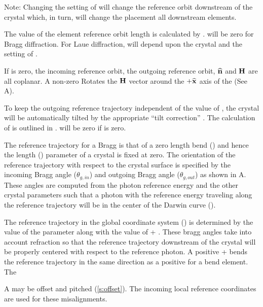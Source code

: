 Note: Changing the setting of  will change the
reference orbit downstream of the crystal which, in turn, will change
the placement all downstream elements.

The value of the element reference orbit length  is calculated
by \bmad.  will be zero for Bragg diffraction. For Laue
diffraction,  will depend upon the crystal  and
the setting of .

If  is zero, the incoming reference orbit, the outgoing
reference orbit, ${\widehat{\bf n}}$ and ${\bf H}$ are all coplanar. A non-zero
 Rotates the ${\bf H}$ vector around the $+{\widehat{\bf x}}$ axis
of the  (See A).

To keep the outgoing reference trajectory independent of the value of
, the crystal will be automatically tilted by the
appropriate ``tilt correction'' . The calculation of
 is outlined in . 
will be zero if  is zero.

The reference trajectory for a Bragg  is that of a zero
length bend () and hence the length ()
parameter of a crystal is fixed at zero. The orientation of the
reference trajectory with respect to the crystal surface is specified
by the incoming Bragg angle  ($\theta_{g,in}$) and
outgoing Bragg angle  ($\theta_{g,out}$) as shown
in A. These angles are computed from the photon
reference energy and the other crystal parameters such that a photon
with the reference energy traveling along the reference trajectory
will be in the center of the Darwin curve ().

The reference trajectory in the global coordinate system
() is determined by the value of the 
parameter along with the value of  +
. These bragg angles take into account refraction
so that the reference trajectory downstream of the crystal will be
properly centered with respect to the reference photon. A positive
 +  bends the reference
trajectory in the same direction as a positive  for a bend
element. The

A  may be offset and pitched (\ref{s:offset}). The incoming
local reference coordinates are used for these misalignments. 

